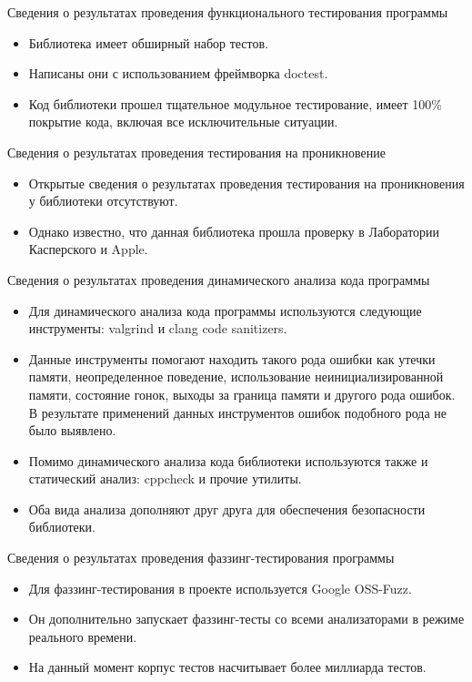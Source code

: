 \documentclass[10pt]{beamer}
\begin{document}
\begin{frame}{Сведения о результатах проведения функционального тестирования программы}
    \begin{itemize}
        \item Библиотека имеет обширный набор тестов.
        \item Написаны они с использованием фреймворка doctest.
        \item Код библиотеки прошел тщательное модульное тестирование, имеет 100\% покрытие кода, включая все исключительные ситуации.
    \end{itemize}
\end{frame}

\begin{frame}{Сведения о результатах проведения тестирования на проникновение}
    \begin{itemize}
        \item Открытые сведения о результатах проведения тестирования на проникновения у библиотеки отсутствуют.
        \item Однако известно, что данная библиотека прошла проверку в Лаборатории Касперского и Apple.
    \end{itemize}
\end{frame}

\begin{frame}{Сведения о результатах проведения динамического анализа кода программы}
    \begin{itemize}
        \item Для динамического анализа кода программы используются следующие инструменты: valgrind и clang code sanitizers.
        \item Данные инструменты помогают находить такого рода ошибки как утечки памяти, неопределенное поведение, использование неинициализированной памяти, состояние гонок, выходы за граница памяти и другого рода ошибок. В результате применений данных инструментов ошибок подобного рода не было выявлено.

        \item Помимо динамического анализа кода библиотеки используются также и статический анализ: cppcheck и прочие утилиты.
        \item Оба вида анализа дополняют друг друга для обеспечения безопасности библиотеки.

    \end{itemize}
\end{frame}

\begin{frame}{Сведения о результатах проведения фаззинг-тестирования программы}
    \begin{itemize}

    \item Для фаззинг-тестирования в проекте используется Google OSS-Fuzz.
    \item Он дополнительно запускает фаззинг-тесты со всеми анализаторами в режиме реального времени.
    \item На данный момент корпус тестов насчитывает более миллиарда тестов.

    \end{itemize}
\end{frame}
\end{document}
